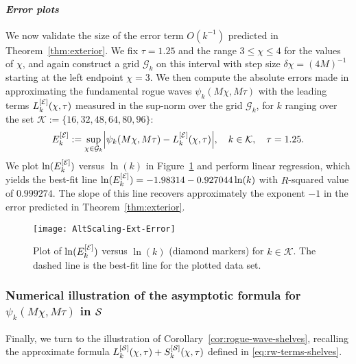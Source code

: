 \paragraph{\textit{Error plots}} We now validate the size of the error term
$O(k^{-1})$ predicted in Theorem~\ref{thm:exterior}. We fix $\tau=1.25$ and the range $3\leq \chi \leq 4$ for the values of $\chi$, and again construct a grid $\mathcal{G}_k$ on this interval with step size
$\delta\chi = (4M)^{-1}$ starting at the left endpoint $\chi=3$. 
We then compute the absolute errors made in approximating the fundamental rogue waves $\psi_k(M\chi,M\tau)$ with the leading terms $L_k^{[\mathcal{E}]}(\chi,\tau)$ measured in the sup-norm over the grid $\mathcal{G}_k$, for $k$ ranging over the set $\mathcal{K} := \{16, 32, 48, 64, 80, 96 \}$:
\begin{equation}
E_k^{[\exterior]}:= \sup_{\chi \in \mathcal{G}_k} \left| \psi_{k}(M\chi,M\tau) - L_k^{[\exterior]}(\chi,\tau) \right|, \quad k\in\mathcal{K},\quad \tau=1.25.
\end{equation}
We plot $\ln(E_k^{[\mathcal{E}]})$ versus $\ln(k)$ in Figure~\ref{f:exterior-errors} and perform linear regression, which yields the best-fit line $\ln(E_k^{[\mathcal{E}]}) =-1.98314 - 0.927044 \ln(k)$ with $R$-squared value of $0.999274$. The slope of this line recovers approximately the exponent $-1$ in the error predicted in Theorem~\ref{thm:exterior}.
\begin{figure}[h]
\texttt{[image: AltScaling-Ext-Error]}
\caption{Plot of $\ln(E_k^{[\mathcal{E}]})$ versus $\ln(k)$ (diamond markers) for $k\in\mathcal{K}$. The dashed line is the best-fit line for the plotted data set.}
\label{f:exterior-errors}
\end{figure}
\subsubsection{Numerical illustration of the asymptotic formula for $\psi_k(M\chi,M\tau)$ in $\mathcal{S}$} 
Finally, we turn to the illustration of Corollary~\ref{cor:rogue-wave-shelves}, recalling the approximate formula $L_k^{[\mathcal{S}]}(\chi,\tau)+S_k^{[\mathcal{S}]}(\chi,\tau)$ defined in \eqref{eq:rw-terms-shelves}.

